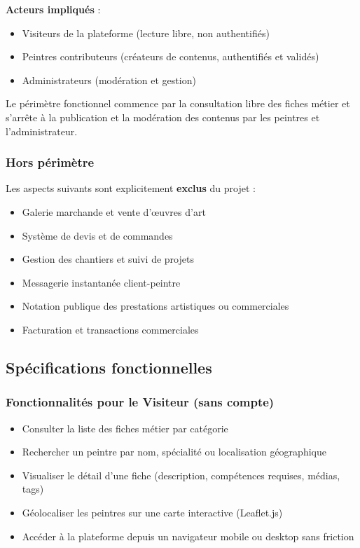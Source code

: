 \documentclass[12pt,a4paper]{report}
\begin{document}
\textbf{Acteurs impliqués} :
\begin{itemize}
  \item Visiteurs de la plateforme (lecture libre, non authentifiés)
  \item Peintres contributeurs (créateurs de contenus, authentifiés et validés)
  \item Administrateurs (modération et gestion)
\end{itemize}

Le périmètre fonctionnel commence par la consultation libre des fiches métier et s'arrête à la publication et la modération des contenus par les peintres et l'administrateur.

\subsubsection*{Hors périmètre}

Les aspects suivants sont explicitement \textbf{exclus} du projet :

\begin{itemize}
  \item Galerie marchande et vente d'œuvres d'art
  \item Système de devis et de commandes
  \item Gestion des chantiers et suivi de projets
  \item Messagerie instantanée client-peintre
  \item Notation publique des prestations artistiques ou commerciales
  \item Facturation et transactions commerciales
\end{itemize}

\subsection{Spécifications fonctionnelles}

\subsubsection*{Fonctionnalités pour le Visiteur (sans compte)}

\begin{itemize}[leftmargin=1.5cm]
  \item Consulter la liste des fiches métier par catégorie
  \item Rechercher un peintre par nom, spécialité ou localisation géographique
  \item Visualiser le détail d'une fiche (description, compétences requises, médias, tags)
  \item Géolocaliser les peintres sur une carte interactive (Leaflet.js)
  \item Accéder à la plateforme depuis un navigateur mobile ou desktop sans friction
\end{itemize}
\end{document}
